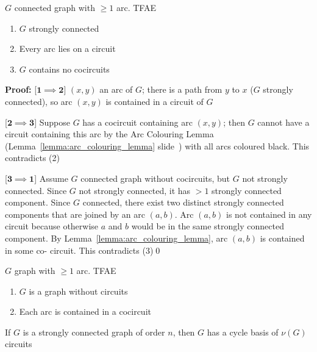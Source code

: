 \documentclass[aspectratio=169]{beamer}
\begin{document}
\begin{frame}
\begin{theorem}
$G$ connected graph with $\geq 1$ arc. TFAE
\begin{enumerate}
\item $G$ strongly connected
\item Every arc lies on a circuit
\item $G$ contains no cocircuits
\end{enumerate}
\end{theorem}
\vfill
\textbf{Proof:}
[$\mathbf{1\implies 2}$]
$(x,y)$ an arc of $G$; there is a path from $y$ to $x$ ($G$ strongly connected), so arc $(x,y)$ is contained in a circuit of $G$

[$\mathbf{2\implies 3}$]
Suppose $G$ has a cocircuit containing arc $(x,y)$; then $G$ cannot have
a circuit containing this arc by the Arc Colouring Lemma (Lemma~\ref{lemma:arc_colouring_lemma} slide~\pageref{lemma:arc_colouring_lemma}) with
all arcs coloured black. This contradicts (2)

[$\mathbf{3\implies 1}$]
Assume $G$ connected graph without cocircuits, but $G$ not strongly connected.
Since $G$ not strongly connected, it has $>1$ strongly
connected component. 
Since $G$ connected, there exist two distinct strongly connected components that are joined by an arc $(a,b)$. Arc $(a,b)$ is not contained in any circuit because otherwise $a$ and $b$ would be in the same strongly connected component. 
By Lemma~\ref{lemma:arc_colouring_lemma}, arc $(a,b)$ is contained in some co-
circuit. This contradicts (3)\qed
\end{frame}


\begin{frame}
\begin{theorem}
$G$ graph with $\geq 1$ arc. TFAE
\begin{enumerate}
\item $G$ is a graph without circuits
\item Each arc is contained in a cocircuit
\end{enumerate}
\end{theorem}
\vfill
\begin{theorem}
If $G$ is a strongly connected graph of order $n$, then $G$ has a cycle basis of $\nu(G)$ circuits
\end{theorem}
\end{frame}
\end{document}
